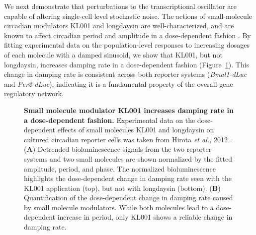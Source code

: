 \documentclass[11pt, letterpaper]{article}
\begin{document}
We next demonstrate that perturbations to the transcriptional oscillator are capable of altering single-cell level stochastic noise.
The actions of small-molecule circadian modulators KL001 and longdaysin are well-characterized, and are known to affect circadian period and amplitude in a dose-dependent fashion \cite{St.John2014}.
By fitting experimental data on the population-level responses to increasing dosages of each molecule with a damped sinusoid, we show that KL001, but not longdaysin, increases damping rate in a dose-dependent fashion (Figure~\ref{fig:dose_dependence}).
This change in damping rate is consistent across both reporter systems ({\itshape Bmal1-dLuc} and {\itshape Per2-dLuc}), indicating it is a fundamental property of the overall gene regulatory network.

\begin{figure}[tbp]
  \begin{center}
  \end{center}
  \caption{{\bfseries Small molecule modulator KL001 increases damping rate in a dose-dependent fashion.}
  Experimental data on the dose-dependent effects of small molecules KL001 and longdaysin on cultured circadian reporter cells was taken from Hirota {\itshape et al.,} 2012 \cite{Hirota2012}.
({\bfseries A}) Detrended bioluminescence signals from the two reporter systems and two small molecules are shown normalized by the fitted amplitude, period, and phase. The normalized bioluminescence highlights the dose-dependent change in damping rate seen with the KL001 application (top), but not with longdaysin (bottom).
({\bfseries B}) Quantification of the dose-dependent change in damping rate caused by small molecule modulators. While both molecules lead to a dose-dependent increase in period, only KL001 shows a reliable change in damping rate.}
\label{fig:dose_dependence}
\end{figure}

\end{document}
